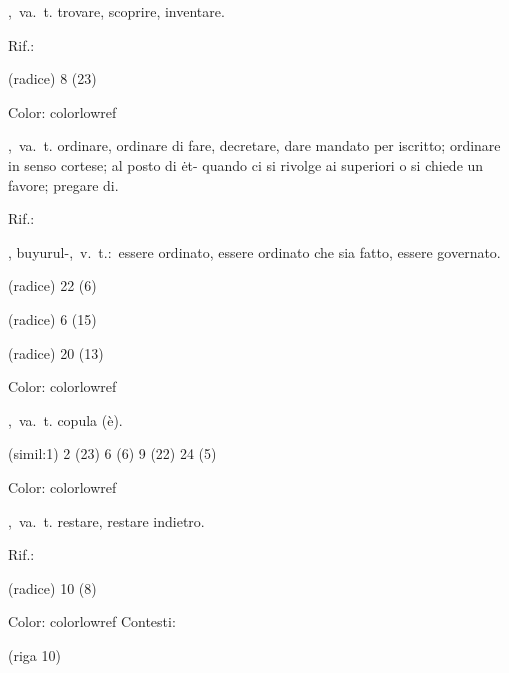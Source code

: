 ,\ va.\ t.
trovare, scoprire, inventare.
\begin{subvocedue}
\item[Rif.:] 
\end{subvocedue}
\begin{subvocedue}
\item[(radice)]   8 (23)
\end{subvocedue}
Color: colorlowref

,\ va.\ t.
ordinare, ordinare  di fare,  decretare, dare mandato per iscritto; ordinare in senso cortese; al posto di ėt- quando ci si rivolge ai superiori o si chiede un favore; pregare di.
\begin{subvocedue}
\item[Rif.:] 
\end{subvocedue}
\begin{subvocedue}
\item[\subglossariobullet] , {\sf buyurul-},\ v.\ t.:\ essere ordinato, essere  ordinato che  sia fatto, essere governato.
\item[(radice)]   22 (6)
\item[(radice)]   6 (15)
\item[(radice)]   20 (13)
\end{subvocedue}
Color: colorlowref

,\ va.\ t.
copula (è).
\begin{subvocedue}
\item[(simil:1)]   2 (23) 6 (6) 9 (22) 24 (5)
\end{subvocedue}
Color: colorlowref

,\ va.\ t.
restare, restare indietro.
\begin{subvocedue}
\item[Rif.:] 
\end{subvocedue}
\begin{subvocedue}
\item[(radice)]   10 (8)
\end{subvocedue}
Color: colorlowref
Contesti:
\begin{subvocedue}
\item[(riga 10)] 
\end{subvocedue}

